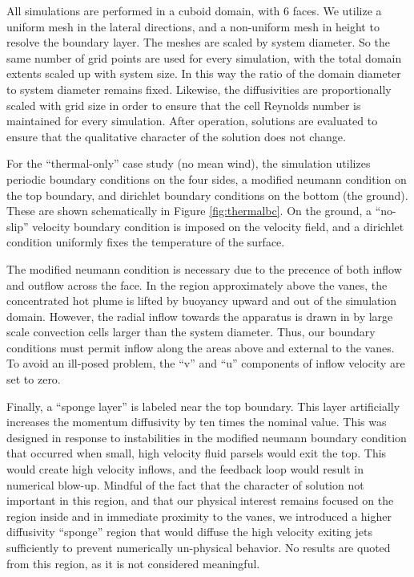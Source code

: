 All simulations are performed in a cuboid domain, with 6 faces. We
utilize a uniform mesh in the lateral directions, and a non-uniform mesh
in height to resolve the boundary layer. The meshes are scaled by system
diameter. So the same number of grid points are used for every
simulation, with the total domain extents scaled up with system size. In
this way the ratio of the domain diameter to system diameter remains
fixed. Likewise, the diffusivities are proportionally scaled with grid
size in order to ensure that the cell Reynolds number is maintained for
every simulation. After operation, solutions are evaluated to ensure
that the qualitative character of the solution does not change. 


%
%

For the ``thermal-only'' case study (no mean wind), the simulation
utilizes periodic boundary conditions on the four sides, a modified
neumann condition on the top boundary, and dirichlet boundary conditions
on the bottom (the ground). These are shown schematically in Figure
\ref{fig:thermalbc}. On the ground, a ``no-slip'' velocity boundary
condition is imposed on the velocity field, and a dirichlet condition
uniformly fixes the temperature of the surface. 

The modified neumann condition is necessary due to the precence of both
inflow and outflow across the face. In the region approximately above
the vanes, the concentrated hot plume is lifted by buoyancy
upward and out of the simulation domain. However, the radial inflow
towards the apparatus is drawn in by large scale convection cells larger
than the system diameter. Thus, our boundary conditions must permit
inflow along the areas above and external to the vanes. To avoid an
ill-posed problem, the ``v'' and ``u'' components of inflow velocity are
set to zero.  

Finally, a ``sponge layer'' is labeled near the top boundary. This layer
artificially increases the momentum diffusivity by ten times the nominal
value. This was designed in response to instabilities in the modified
neumann boundary condition that occurred when small, high velocity fluid
parsels would exit the top. This would create high velocity inflows, and
the feedback loop would result in numerical blow-up. Mindful of the fact
that the character of solution not important in this region, and that
our physical interest remains focused on the region inside and
in immediate proximity to the vanes, we introduced a higher diffusivity
``sponge'' region that would diffuse the high velocity exiting jets
sufficiently to prevent numerically un-physical behavior. No results are
quoted from this region, as it is not considered meaningful. 


